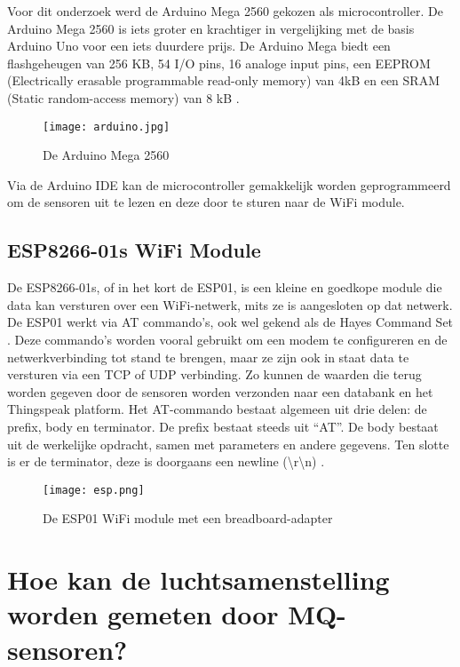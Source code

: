Voor dit onderzoek werd de Arduino Mega 2560 gekozen als microcontroller. De Arduino Mega 2560 is iets groter en krachtiger in vergelijking met de basis Arduino Uno voor een iets duurdere prijs. De Arduino Mega biedt een flashgeheugen van 256 KB, 54 I/O pins, 16 analoge input pins, een EEPROM (Electrically erasable programmable read-only memory) van 4kB en een SRAM (Static random-access memory) van 8 kB \autocite{Arduino}.

\begin{figure}[h]
    \texttt{[image: arduino.jpg]}
    \caption[Arduino Mega]{De Arduino Mega 2560}
    \label{fig:arduino}
\end{figure}


Via de Arduino IDE kan de microcontroller gemakkelijk worden geprogrammeerd om de sensoren uit te lezen en deze door te sturen naar de WiFi module.

\subsection{ESP8266-01s WiFi Module}%
\label{subsec:esp01}

De ESP8266-01s, of in het kort de ESP01, is een kleine en goedkope module die data kan versturen over een WiFi-netwerk, mits ze is aangesloten op dat netwerk. De ESP01 werkt via AT commando's, ook wel gekend als de Hayes Command Set \autocite{Bales2023}. Deze commando's worden vooral gebruikt om een ​​modem te configureren en de netwerkverbinding tot stand te brengen, maar ze zijn ook in staat data te versturen via een TCP of UDP verbinding. Zo kunnen de waarden die terug worden gegeven door de sensoren worden verzonden naar een databank en het Thingspeak platform.
Het AT-commando bestaat algemeen uit drie delen: de prefix, body en terminator. De prefix bestaat steeds uit ``AT''. De body bestaat uit de werkelijke opdracht, samen met parameters en andere gegevens. Ten slotte is er de terminator, deze is doorgaans een newline (\textbackslash r\textbackslash n) \autocite{Teltonika}.

\begin{figure}[h]
    \texttt{[image: esp.png]}
    \caption[ESP01 WiFi module]{De ESP01 WiFi module met een breadboard-adapter}
    \label{fig:esp}
\end{figure}



\section{Hoe kan de luchtsamenstelling worden gemeten door MQ-sensoren?}%
\label{sec:hoe-luchtsamenstelling meten}

